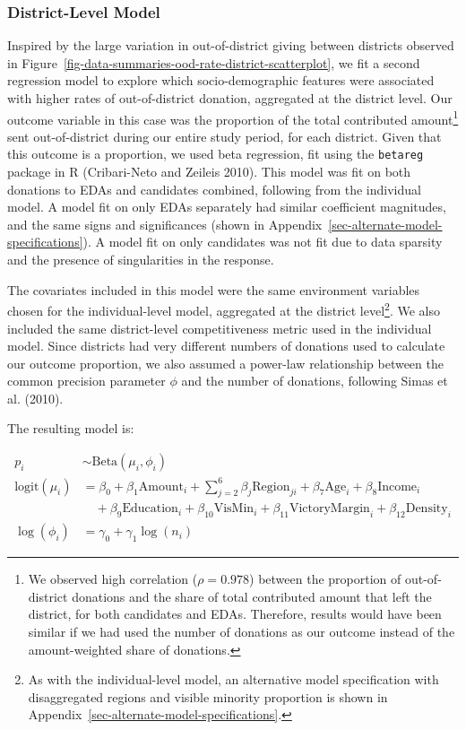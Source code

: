 \documentclass[
  letterpaper,
  DIV=11,
  numbers=noendperiod]{scrartcl}
\begin{document}
\subsubsection{District-Level
Model}\label{sec-model-specification-district}

Inspired by the large variation in out-of-district giving between
districts observed in
Figure~\ref{fig-data-summaries-ood-rate-district-scatterplot}, we fit a
second regression model to explore which socio-demographic features were
associated with higher rates of out-of-district donation, aggregated at
the district level. Our outcome variable in this case was the proportion
of the total contributed amount\footnote{We observed high correlation
  (\(\rho = 0.978\)) between the proportion of out-of-district donations
  and the share of total contributed amount that left the district, for
  both candidates and EDAs. Therefore, results would have been similar
  if we had used the number of donations as our outcome instead of the
  amount-weighted share of donations.} sent out-of-district during our
entire study period, for each district. Given that this outcome is a
proportion, we used beta regression, fit using the \texttt{betareg}
package in R (Cribari-Neto and Zeileis 2010). This model was fit on both
donations to EDAs and candidates combined, following from the individual
model. A model fit on only EDAs separately had similar coefficient
magnitudes, and the same signs and significances (shown in
Appendix~\ref{sec-alternate-model-specifications}). A model fit on only
candidates was not fit due to data sparsity and the presence of
singularities in the response.

The covariates included in this model were the same environment
variables chosen for the individual-level model, aggregated at the
district level\footnote{As with the individual-level model, an
  alternative model specification with disaggregated regions and visible
  minority proportion is shown in
  Appendix~\ref{sec-alternate-model-specifications}.}. We also included
the same district-level competitiveness metric used in the individual
model. Since districts had very different numbers of donations used to
calculate our outcome proportion, we also assumed a power-law
relationship between the common precision parameter \(\phi\) and the
number of donations, following Simas et al. (2010).

The resulting model is:

\[
\begin{aligned}
p_i &\sim \text{Beta}(\mu_i, \phi_i) \\
\text{logit}(\mu_i) &= \beta_0 + \beta_1 \text{Amount}_i + \sum_{j=2}^{6} \beta_j \text{Region}_{ji} + \beta_7 \text{Age}_i + \beta_8 \text{Income}_i \\
&\quad  + \beta_9 \text{Education}_i + \beta_{10} \text{VisMin}_i + \beta_{11} \text{VictoryMargin}_i + \beta_{12} \text{Density}_i \\
\log(\phi_i) &= \gamma_0 + \gamma_1\log(n_i)
\end{aligned}
\]
\end{document}
